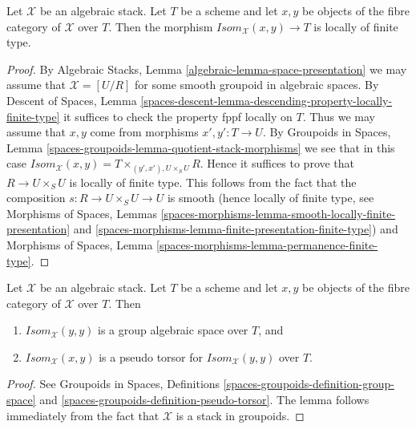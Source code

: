 \begin{lemma}
\label{lemma-isom-locally-finite-type}
Let $\mathcal{X}$ be an algebraic stack.
Let $T$ be a scheme and let $x, y$ be objects of the fibre category of
$\mathcal{X}$ over $T$. Then the morphism
$\textit{Isom}_{\mathcal{X}}(x, y) \to T$ is locally of finite type.
\end{lemma}

\begin{proof}
By
Algebraic Stacks, Lemma \ref{algebraic-lemma-space-presentation}
we may assume that $\mathcal{X} = [U/R]$ for some smooth
groupoid in algebraic spaces.
By
Descent of Spaces,
Lemma \ref{spaces-descent-lemma-descending-property-locally-finite-type}
it suffices to check the property fppf locally on $T$.
Thus we may assume that $x, y$ come from morphisms
$x', y' : T \to U$. By
Groupoids in Spaces,
Lemma \ref{spaces-groupoids-lemma-quotient-stack-morphisms}
we see that in this case
$\textit{Isom}_{\mathcal{X}}(x, y) = T \times_{(y', x'), U \times_S U} R$.
Hence it suffices to prove that $R \to U \times_S U$ is
locally of finite type. This follows from the fact that the composition
$s : R \to U \times_S U \to U$ is smooth (hence locally of finite type, see
Morphisms of Spaces, Lemmas
\ref{spaces-morphisms-lemma-smooth-locally-finite-presentation} and
\ref{spaces-morphisms-lemma-finite-presentation-finite-type})
and
Morphisms of Spaces, Lemma \ref{spaces-morphisms-lemma-permanence-finite-type}.
\end{proof}

\begin{lemma}
\label{lemma-isom-pseudo-torsor-aut}
Let $\mathcal{X}$ be an algebraic stack.
Let $T$ be a scheme and let $x, y$ be objects of the fibre category of
$\mathcal{X}$ over $T$. Then
\begin{enumerate}
\item $\textit{Isom}_{\mathcal{X}}(y, y)$ is a group algebraic space
over $T$, and
\item $\textit{Isom}_{\mathcal{X}}(x, y)$ is a pseudo torsor for
$\textit{Isom}_{\mathcal{X}}(y, y)$ over $T$.
\end{enumerate}
\end{lemma}

\begin{proof}
See
Groupoids in Spaces,
Definitions \ref{spaces-groupoids-definition-group-space} and
\ref{spaces-groupoids-definition-pseudo-torsor}.
The lemma follows immediately from the fact that $\mathcal{X}$ is a
stack in groupoids.
\end{proof}

